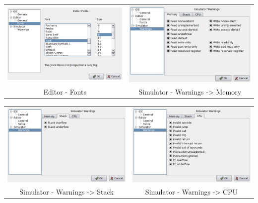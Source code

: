         \begin{table}[h!]
            \begin{tabular}{cc}
                \includegraphics[width=.5\textwidth]{img/interface3.png}
                    &
                \includegraphics[width=.5\textwidth]{img/interface4.png}
                    \\
                Editor - Fonts & Simulator - Warnings -> Memory
            \end{tabular}
        \end{table}

        \begin{table}[h!]
            \begin{tabular}{cc}
                \includegraphics[width=.5\textwidth]{img/interface5.png}
                    &
                \includegraphics[width=.5\textwidth]{img/interface6.png}
                    \\
                Simulator - Warnings -> Stack & Simulator - Warnings -> CPU
            \end{tabular}
        \end{table}


